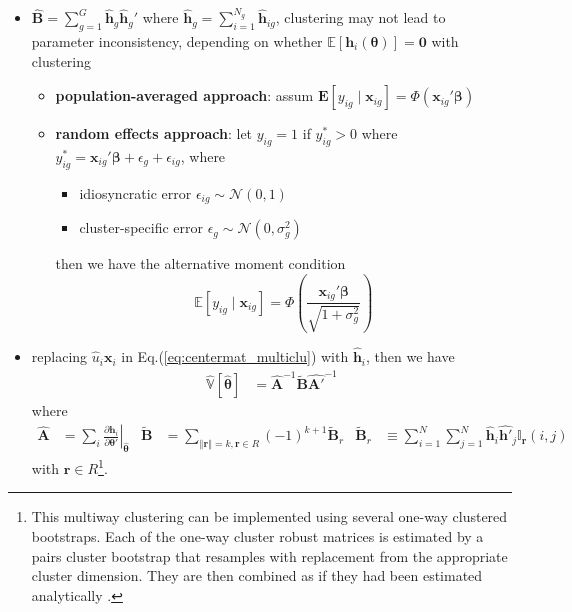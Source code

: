 \documentclass[twoside]{article}
\begin{document}
\begin{itemize}
    \item {} $\hat{\mathbf{B}} = \sum^G_{g=1}\hat{\mathbf{h}}_g\hat{\mathbf{h}}_g'$ where $\hat{\mathbf{h}}_g = \sum^{N_g}_{i=1}\hat{\mathbf{h}}_{ig}$, clustering may not lead to parameter inconsistency, depending on whether $\mathbb{E}\left[\mathbf{h}_i(\boldsymbol{\theta})\right]= \mathbf{0}$ with clustering
    \begin{itemize}
        \item \textbf{population-averaged approach}: assum $\mathbf{E}\left[y_{ig}\mid \mathbf{x}_{ig}\right] = \Phi \left( \mathbf{x}_{ig}'\boldsymbol{\beta} \right)$
        \item \textbf{random effects approach}: let $y_{ig}=1$ if $y^*_{ig} > 0$ where $y^*_{ig}=\mathbf{x}_{ig}'\boldsymbol{\beta}+\epsilon_g + \epsilon_{ig}$, where 
        \begin{itemize}
            \item idiosyncratic error $\epsilon_{ig}\sim \mathcal{N}(0,1)$
            \item cluster-specific error $\epsilon_g \sim \mathcal{N}(0,\sigma^2_g)$
        \end{itemize}
        then we have the alternative moment condition $$ \mathbb{E}\left[y_{ig}\mid \mathbf{x}_{ig}\right] = \Phi\left(\frac{\mathbf{x}_{ig}'\boldsymbol{\beta}}{\sqrt{1+\sigma^2_g}}\right) $$ 
    \end{itemize}
    \item {} replacing $\hat{u}_i\mathbf{x}_i$ in Eq.(\ref{eq:centermat_multiclu}) with $\hat{\mathbf{h}}_i$, then we have 
    \begin{align*}
        \hat{\mathbb{V}} \left[\hat{\boldsymbol{\theta}}\right] &= \hat{\mathbf{A}}^{-1} \tilde{\mathbf{B}} \hat{\mathbf{A}'}^{-1}
    \end{align*}
    where 
    \begin{align*}
        \hat{\mathbf{A}} &= \sum_i \left. \frac{\partial \mathbf{h}_i}{\partial \boldsymbol{\theta}'}\right\vert _{\hat{\boldsymbol{\theta}}} & \tilde{\mathbf{B}} &= \sum_{\left\Vert \mathbf{r} \right\Vert =k,\mathbf{r}\in R} (-1)^{k+1}\tilde{\mathbf{B}}_r & \tilde{\mathbf{B}}_r &\equiv \sum^N_{i=1}\sum^N_{j=1}\hat{\mathbf{h}}_i\hat{\mathbf{h}'}_j\mathbb{I}_{\mathbf{r}}(i,j)
    \end{align*}
    with $\mathbf{r}\in R$\footnote{This multiway clustering can be implemented using several one-way clustered bootstraps. Each of the one-way cluster robust matrices is estimated by a pairs cluster bootstrap that resamples with replacement from the appropriate cluster dimension. They are then combined as if they had been estimated analytically \citep{cameron2011robust}.}.
\end{itemize} 
\end{document}
